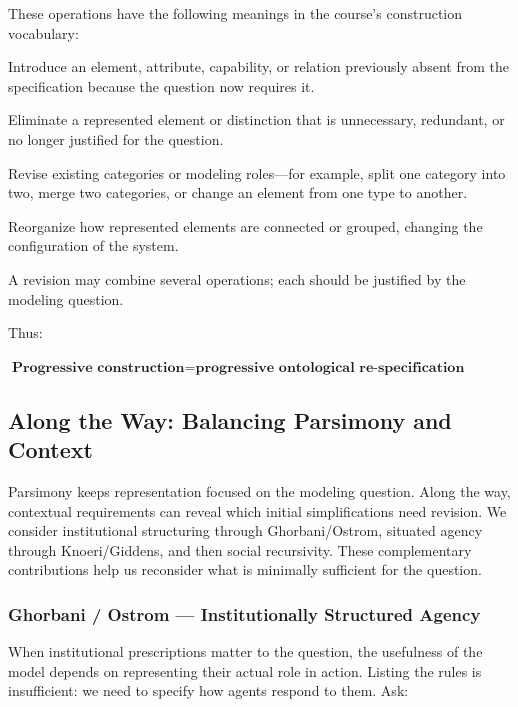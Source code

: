 \documentclass[11pt,a4paper]{article}
\newenvironment{fitdisplay}{\par\medskip\noindent\begin{lrbox}{\displaybox}$\displaystyle}{%
$\end{lrbox}\makebox[\linewidth][c]{\ifdim\wd\displaybox>\linewidth\resizebox{\linewidth}{!}{\usebox{\displaybox}}\else\usebox{\displaybox}\fi}\par\medskip}
\begin{document}
These operations have the following meanings in the course's construction vocabulary:

\begin{description}[style=nextline,leftmargin=0pt,itemsep=4pt]
\item[ADD] Introduce an element, attribute, capability, or relation previously absent from the specification because the question now requires it.
\item[REMOVE] Eliminate a represented element or distinction that is unnecessary, redundant, or no longer justified for the question.
\item[DE-/RECLASSIFY] Revise existing categories or modeling roles---for example, split one category into two, merge two categories, or change an element from one type to another.
\item[RECOMBINE] Reorganize how represented elements are connected or grouped, changing the configuration of the system.
\end{description}

A revision may combine several operations; each should be justified by the modeling question.

Thus:

\begin{fitdisplay}
\boxed{
\textbf{Progressive construction}
=
\textbf{progressive ontological re-specification}
}
\end{fitdisplay}



\subsection{Along the Way: Balancing Parsimony and Context}

Parsimony keeps representation focused on the modeling question. Along the way, contextual requirements can reveal which initial simplifications need revision. We consider institutional structuring through Ghorbani/Ostrom, situated agency through Knoeri/Giddens, and then social recursivity. These complementary contributions help us reconsider what is minimally sufficient for the question.

\subsubsection{Ghorbani / Ostrom --- Institutionally Structured Agency}

When institutional prescriptions matter to the question, the usefulness of the model depends on representing their actual role in action. Listing the rules is insufficient: we need to specify how agents respond to them. Ask:
\end{document}
